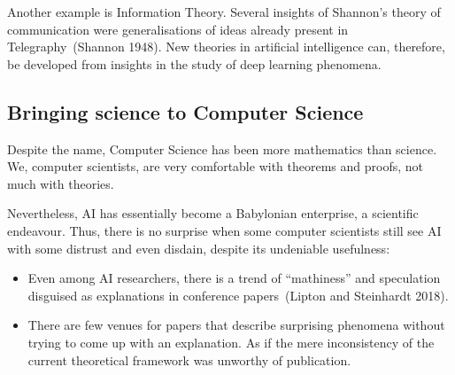 \documentclass[
  letterpaper,
  12pt,
  british]{tufte-book}
\theoremstyle{plain}
\theoremstyle{plain}
\theoremstyle{definition}
\theoremstyle{remark}
\begin{document}
Another example is Information Theory. Several insights of Shannon's
theory of communication were generalisations of ideas already present in
Telegraphy~(Shannon
1948).
New theories in artificial intelligence can, therefore, be developed
from insights in the study of deep learning phenomena.

\hypertarget{sec-bringing_science}{%
\subsection{Bringing science to Computer
Science}\label{sec-bringing_science}}

Despite the name, Computer Science has been more mathematics than
science. We, computer scientists, are very comfortable with theorems and
proofs, not much with theories.

Nevertheless, {AI} has essentially become a Babylonian enterprise, a
scientific endeavour. Thus, there is no surprise when some computer
scientists still see AI with some distrust and even disdain, despite its
undeniable usefulness:

\begin{itemize}
\item
  Even among AI researchers, there is a trend of ``mathiness'' and
  speculation disguised as explanations in conference papers~(Lipton and
  Steinhardt
  2018).
\item
  There are few venues for papers that describe surprising phenomena
  without trying to come up with an explanation. As if the mere
  inconsistency of the current theoretical framework was unworthy of
  publication.
\end{itemize}
\end{document}
